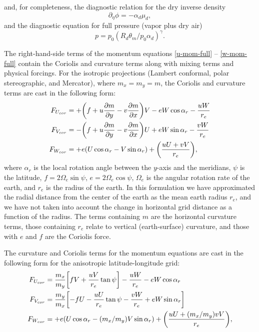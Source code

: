 \noindent
and, for completeness, 
the diagnostic relation for the dry inverse density
%
\begin{equation}
\partial_\eta \phi  = - \alpha_d \mu_d,
\label{hydro-full}
\end{equation}
%
\noindent
and the diagnostic equation for full pressure (vapor plus dry air)
%
\begin{equation}
p = p_0 (R_d \theta_m / p_0 \alpha_d)^{\gamma}.
\label{moist-state-equation}
\end{equation}
%

The right-hand-side terms of the momentum equations
\eqref{u-mom-full} -- \eqref{w-mom-full} contain the Coriolis and 
curvature terms along with mixing terms and 
physical forcings.  For the isotropic projections 
(Lambert conformal, polar stereographic, and Mercator), where
$m_x=m_y=m$, the Coriolis and
curvature terms are cast in the following form:
\begin{align}
F_{U_{cor}} & =  + \biggl(f + u {\partial m \over
\partial y} - v {\partial m \over \partial x}\biggr) V
- e W \cos \alpha_r - {uW \over r_e} 
\label{u-mom-rhs}
\\
%
F_{V_{cor}} & = - \biggl(f + u {\partial m \over
\partial y} - v {\partial m \over \partial x}\biggr) U
+ e W \sin \alpha_r - {v W \over r_e} \\
%
F_{W_{cor}} & = + e (U \cos \alpha_r - V \sin \alpha_r) 
+ \biggl({ uU +vV \over r_e}\biggr),
\label{w-mom-rhs}
\end{align}
\noindent
where $\alpha_r$ is the local rotation angle between the $y$-axis and the
meridians, $\psi$ is the latitude, $f = 2 \Omega_e \sin \psi $, $e = 2
\Omega_e \cos \psi$, $\Omega_e$ is the angular rotation rate of the earth,
and $r_e$ is the radius of the earth.  In this
formulation we have approximated the radial distance from the center of
the earth as the mean earth radius $r_e$, and we have not taken into account
the change in horizontal grid distance as a function of the radius.
The terms containing $m$ are the horizontal curvature terms, those
containing $r_e$ relate to vertical (earth-surface) curvature, and those
with $e$ and $f$ are the Coriolis force.

The curvature and Coriolis terms for the momentum equations
are cast in the following form  
for the anisotropic latitude-longitude grid:
%
\begin{align}
F_{U_{cor}} & =  {m_x \over m_y} \biggl[fV + {uV \over r_e} 
\tan\psi \biggr] - {uW \over r_e} -eW\cos \alpha_r 
\label{u-mom-rhs-global}
\\
%
F_{V_{cor}} & =  {m_y \over m_x} \biggl[ - fU - {uU \over r_e}
\tan \psi  - {vW \over r_e}
+ eW\sin \alpha_r  \biggr] 
\label{v-mom-rhs-global}
\\
%
F_{W_{cor}} & = + e (U \cos \alpha_r - (m_x/m_y) V \sin \alpha_r) 
+ \biggl({ uU + (m_x/m_y) vV \over r_e}\biggr),
\label{w-mom-rhs-global}
%
\end{align}

